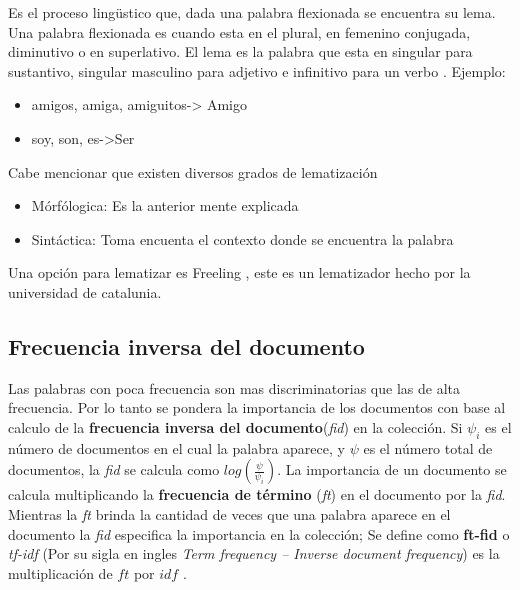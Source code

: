 Es el proceso lingüstico que, dada una palabra flexionada se encuentra su
lema. Una palabra flexionada es cuando esta en el plural, en femenino conjugada,
diminutivo o en superlativo. El lema es la palabra que esta en singular para
sustantivo, singular masculino para adjetivo e infinitivo para un verbo \citep{CT13}. Ejemplo:

	\begin{itemize}
		\item amigos, amiga, amiguitos-> Amigo
		\item soy, son, es->Ser
	\end{itemize}

Cabe mencionar que existen diversos grados de lematización

	\begin{itemize}
		\item Mórfólogica: Es la anterior mente explicada
		\item Sintáctica: Toma encuenta el contexto donde se encuentra la palabra

	\end{itemize}

Una opción para lematizar es Freeling \citep{CT18}, este es un lematizador hecho por la
universidad de catalunia.


\subsection{Frecuencia inversa del documento}

Las palabras con poca frecuencia son mas discriminatorias que las de alta frecuencia. Por lo tanto se pondera la importancia de los documentos con base al calculo de la \textbf{frecuencia inversa del documento}(\textit{fid}) en la colección. Si $\psi_i$ es el número de documentos en el cual la palabra aparece, y $\psi$ es el número total de documentos, la \textit{fid} se calcula como $log(\frac{\psi}{\psi_i})$. La importancia de un documento se calcula multiplicando la \textbf{frecuencia de término} (\textit{ft}) en el documento por la \textit{fid}. Mientras la \textit{ft} brinda la cantidad de veces  que una palabra aparece en el documento la \textit{fid} especifica la importancia en la colección; Se define como \textbf{ft-fid} o \textit{tf-idf} (Por su sigla en ingles \textit{Term frequency – Inverse document frequency}) es la multiplicación de $ft$ por $idf$ \citep{CD1}.




